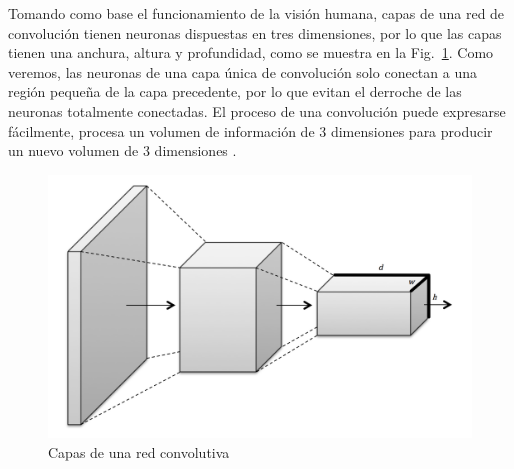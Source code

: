     Tomando como base el funcionamiento de la visión humana, capas de una red de convolución tienen neuronas dispuestas en tres dimensiones, por lo que las capas tienen una anchura, altura y profundidad, como se muestra en la Fig.~\ref{fig:convnet_scheme}. Como veremos, las neuronas de una capa única de convolución solo conectan a una región pequeña de la capa precedente, por lo que evitan el derroche de las neuronas totalmente conectadas. El proceso de una convolución puede expresarse fácilmente, procesa un volumen de información de 3 dimensiones para producir un nuevo volumen de 3 dimensiones \cite{dlBook}.
    \begin{figure}[htp]
        \centering
        \includegraphics[scale=0.32]{chapter3/convnet_scheme.png}
        \caption{Capas de una red convolutiva}
        \label{fig:convnet_scheme}
    \end{figure}

